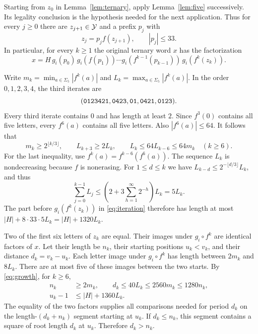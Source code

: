 Starting from \(z_0\) in Lemma~\ref{lem:ternary}, apply
Lemma~\ref{lem:five} successively. Its legality conclusion is the
hypothesis needed for the next application. Thus for every \(j\ge0\)
there are \(z_{j+1}\in\mathcal Y\) and a prefix \(p_j\) with
\[
z_j=p_j f(z_{j+1}),\qquad |p_j|\le33.
\]
In particular, for every \(k\ge1\) the original ternary word \(x\)
has the factorization
\begin{equation}\label{eq:iteration}
x=H\,g_i(p_0)\,g_i(f(p_1))\cdots
     g_i(f^{k-1}(p_{k-1}))\,g_i(f^k(z_k)).
\end{equation}

Write \(m_k=\min_{a\in\Sigma_5}|f^k(a)|\) and
\(L_k=\max_{a\in\Sigma_5}|f^k(a)|\). In the order \(0,1,2,3,4\),
the third iterates are
\[
(\mathtt{0123421},\mathtt{0423},\mathtt{01},\mathtt{0421},\mathtt{0123}).
\]
Every third iterate contains \(0\) and has length at least \(2\).
Since \(f^3(0)\) contains all five letters, every \(f^6(a)\) contains
all five letters. Also \(|f^6(a)|\le 64\). It follows that
\begin{equation}\label{eq:growth}
m_k\ge2^{\lfloor k/3\rfloor},\qquad L_{k+3}\ge2L_k,\qquad
L_k\le64L_{k-6}\le64m_k\quad(k\ge6).
\end{equation}
For the last inequality, use \(f^k(a)=f^{k-6}(f^6(a))\).
The sequence \(L_k\) is nondecreasing because \(f\) is nonerasing.
For \(1\le d\le k\) we have
\(L_{k-d}\le 2^{-\lfloor d/3\rfloor}L_k\), and thus
\begin{equation}\label{eq:sum}
\sum_{j=0}^{k-1} L_j
\le \left(2+3\sum_{h=1}^\infty 2^{-h}\right)L_k=5L_k.
\end{equation}
The part before \(g_i(f^k(z_k))\) in \eqref{eq:iteration} therefore
has length at most \(|H|+8\cdot33\cdot5L_k=|H|+1320L_k\).

Two of the first six letters of \(z_k\) are equal. Their images
under \(g_i\circ f^k\) are identical factors of \(x\). Let their
length be \(n_k\), their starting positions \(u_k<v_k\), and their
distance \(d_k=v_k-u_k\). Each letter image under \(g_i\circ f^k\)
has length between \(2m_k\) and \(8L_k\). There are at most five of
these images between the two starts. By \eqref{eq:growth}, for \(k\ge6\),
\begin{equation}\label{eq:dist}
\begin{aligned}
n_k &\ge2m_k,\qquad
d_k\le40L_k\le2560m_k\le1280n_k,\\
u_k-1 &\le |H|+1360L_k.
\end{aligned}
\end{equation}
The equality of the two factors supplies all comparisons needed
for period \(d_k\) on the length-\((d_k+n_k)\) segment starting at
\(u_k\). If \(d_k\le n_k\), this segment contains a square of root
length \(d_k\) at \(u_k\). Therefore \(d_k>n_k\).

